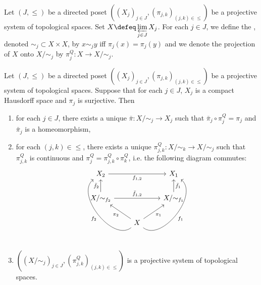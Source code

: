 \documentclass{book}
\begin{document}
\begin{defn}
	Let $(J, \leq)$ be a directed poset $((X_j)_{j \in J}, (\pi_{j,k})_{(j,k) \in \leq})$ be a projective system of topological spaces. Set $X \defeq \varprojlim\limits_{j \in J} X_j$. For each $j \in J$, we define the , denoted ${\sim_j} \subset X \times X$, by $x \sim_j y$ iff $\pi_j(x) = \pi_j(y)$ and we denote the projection of $X$ onto $X/{\sim_j}$ by $\pi^Q_j: X \rightarrow X/{\sim_j}$.
\end{defn}

\begin{ex}
	Let $(J, \leq)$ be a directed poset $((X_j)_{j \in J}, (\pi_{j,k})_{(j,k) \in \leq})$ be a projective system of topological spaces. Suppose that for each $j \in J$, $X_j$ is a compact Hausdorff space and $\pi_j$ is surjective. Then 
	\begin{enumerate}
		\item for each $j \in J$, there exists a unique $\bar{\pi}:X/{\sim_j} \rightarrow X_j$ such that $\bar{\pi}_j \circ \pi^Q_j = \pi_j$ and $\bar{\pi}_j$ is a homeomorphism,
		\item for each $(j,k) \in {\leq}$, there exists a unique $\pi_{j,k}^Q: X/{\sim_k} \rightarrow X/{\sim_j}$ such that $\pi_{j,k}^Q$ is continuous and $\pi_j^Q = \pi_{j,k}^Q \circ \pi_k^Q$, i.e. the following diagram commutes:
		\[ 
		\begin{tikzcd}
			X_2  \arrow[rr, "f_{1,2}"']   & & X_1   \\
			X/ {\sim_{f_2}} \arrow[u, "\bar{f}_2"]   \arrow[rr, "\bar{f}_{1,2}"] & &  X / {\sim_{f_1}} \arrow[u, "\bar{f}_1"']  \\
			& X   \arrow[ul, "\pi_2"] \arrow[ur, "\pi_1"'] \arrow[bend left=90]{luu}{f_2} \arrow[bend right=90, swap]{ruu}{f_1}  & 
		\end{tikzcd}
		\]
		\item $((X / {\sim_j})_{j \in J}, (\pi_{j,k}^Q)_{(j,k) \in \leq})$ is a projective system of topological spaces.
	\end{enumerate}
\end{ex}
\end{document}

